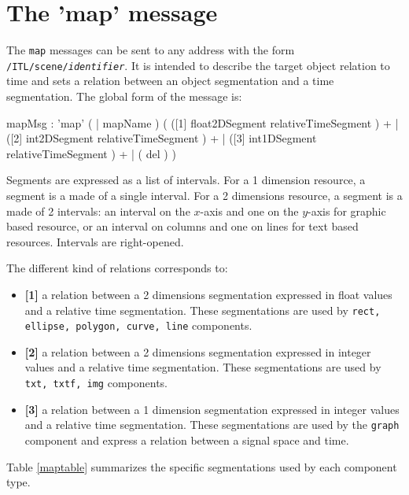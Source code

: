 \documentclass[a4paper,twoside]{report}
\newcommand{\toplevel}[1]	{\chapter{#1}}
\newcommand{\OSC}[1]		{\texttt{#1}}
\begin{document}

\toplevel{The 'map' message}
\label{mapMsg}
The \OSC{map} messages can be sent to any address with the form \OSC{/ITL/scene/\textit{identifier}}. It is intended to describe the target object relation to time and sets a relation between an object segmentation and a time segmentation. 
The global form of the message is:

\begin{rail}
mapMsg : 'map' ( | mapName ) (
		([1] float2DSegment relativeTimeSegment ) +
	| 	([2] int2DSegment relativeTimeSegment ) +
	| 	([3] int1DSegment relativeTimeSegment ) +
	|	( del )
)
\end{rail}

Segments are expressed as a list of intervals. For a 1 dimension resource, a segment is a made of a single interval. For a 2 dimensions resource, a segment is a made of 2 intervals: an interval on the $x$-axis and one on the $y$-axis for graphic based resource, or an interval on columns and one on lines for text based resources. Intervals are right-opened.

The different kind of relations corresponds to:
\begin{itemize}
\item \textbf{[1]} a relation between a 2 dimensions segmentation expressed in float values and a relative time segmentation. These segmentations are used by \OSC{rect, ellipse, polygon, curve, line} components.
\item \textbf{[2]} a relation between a 2 dimensions segmentation expressed in integer values and a relative time segmentation. These segmentations are used by \OSC{txt, txtf, img} components. 
\item \textbf{[3]} a relation between a 1 dimension segmentation expressed in integer values and a relative time segmentation. These segmentations are used by the \OSC{graph} component and express a relation between a signal space and time.
\end{itemize}
Table \ref{maptable} summarizes the specific segmentations used by each component type. 
\end{document}
